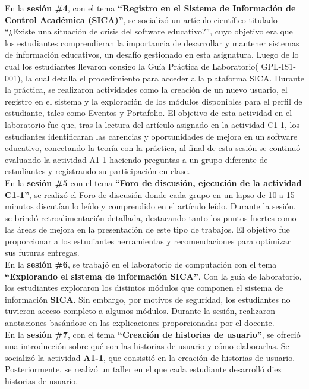 \documentclass[12pt]{article}
\begin{document}
\begin{multicols}{2}
En la \textbf{sesión \#4},  con el tema \textbf{``Registro en el Sistema de Información de Control Académica (SICA)''},  se socializó un artículo científico titulado ``¿Existe una situación de crisis del software educativo?'', cuyo objetivo era que los estudiantes comprendieran la importancia de desarrollar y mantener sistemas de información educativos, un desafío gestionado en esta asignatura. Luego de lo cual los estudiantes llevaron consigo la Guía Práctica de Laboratorio( GPL-IS1-001), la cual detalla el procedimiento para acceder a la plataforma SICA. Durante la práctica, se realizaron actividades como la creación de un nuevo usuario, el registro en el sistema y la exploración de los módulos disponibles para el perfil de estudiante, tales como Eventos y Portafolio. El objetivo de esta actividad en el laboratorio fue que, tras la lectura del artículo asignado en la actividad C1-1, los estudiantes identificaran las carencias y oportunidades de mejora en un software educativo, conectando la teoría con la práctica, al final de esta sesión se continuó evaluando la actividad A1-1 haciendo preguntas a un grupo diferente de estudiantes y registrando su participación en clase.\\
En la \textbf{sesión \#5} con el tema \textbf{``Foro de discusión, ejecución de la actividad C1-1''},  se realizó el Foro de discusión donde cada grupo en un lapso de 10 a 15 minutos discutían lo leído y comprendido en el artículo leído. Durante la sesión, se brindó retroalimentación detallada, destacando tanto los puntos fuertes como las áreas de mejora en la presentación de este tipo de trabajos. El objetivo fue proporcionar a los estudiantes herramientas y recomendaciones para optimizar sus futuras entregas.\\
En la \textbf{sesión \#6}, se trabajó en el laboratorio de computación con el tema \textbf{``Explorando el sistema de información SICA''}. Con la guía de laboratorio, los estudiantes exploraron los distintos módulos que componen el sistema de información \textbf{SICA}. Sin embargo, por motivos de seguridad, los estudiantes no tuvieron acceso completo a algunos módulos. Durante la sesión, realizaron anotaciones basándose en las explicaciones proporcionadas por el docente.\\
En la \textbf{sesión \#7}, con el tema \textbf{``Creación de historias de usuario''}, se ofreció una introducción sobre qué son las historias de usuario y cómo elaborarlas. Se socializó la actividad \textbf{A1-1}, que consistió en la creación de historias de usuario. Posteriormente, se realizó un taller en el que cada estudiante desarrolló diez historias de usuario.\\

\end{multicols}
\end{document}
